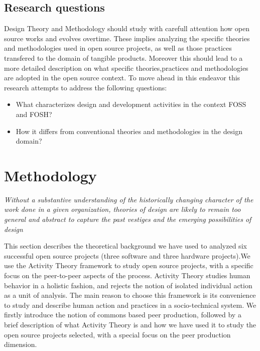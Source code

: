 \documentclass{ICED-Paper}%
\begin{document}
\subsection{Research questions}

\bigskip

Design Theory and Methodology should study with carefull attention how open source works and evolves overtime. These implies analyzing the specific theories and methodologies used in open source projects, as well as those practices transfered to the domain of tangible products. Moreover this should lead to a more detailed description on what specific theories,practices and methodologies are adopted in the open source context. To move ahead in this endeavor this research attempts to address the following questions:
\bigskip

\begin{itemize}
  \item What characterizes design and development activities in the context FOSS and FOSH?
  \item How it differs from conventional theories and methodologies in the design domain?
\end{itemize}


\section{Methodology}
\emph{Without a substantive understanding of the historically changing character of the work done in a given organization, theories of design are likely to remain too general and abstract to capture the past vestiges and the emerging possibilities of design}\cite{ExpansiveDesign}
\bigskip

This section describes the theoretical background we have used to analyzed six successful open source projects (three software and three hardware projects).We use the Activity Theory framework to study open source projects, with a specific focus on the peer-to-peer aspects of the process. Activity Theory studies human behavior in a holistic fashion, and rejects the notion of isolated individual action as a unit of analysis. The main reason to choose this framework is its convenience to study and describe human action and practices in a socio-technical system. We firstly introduce the notion of commons based peer production, followed by a brief description of what  Activity Theory is and how we have used it to study the open source projects selected, with a special focus on the peer production dimension.
\end{document}
